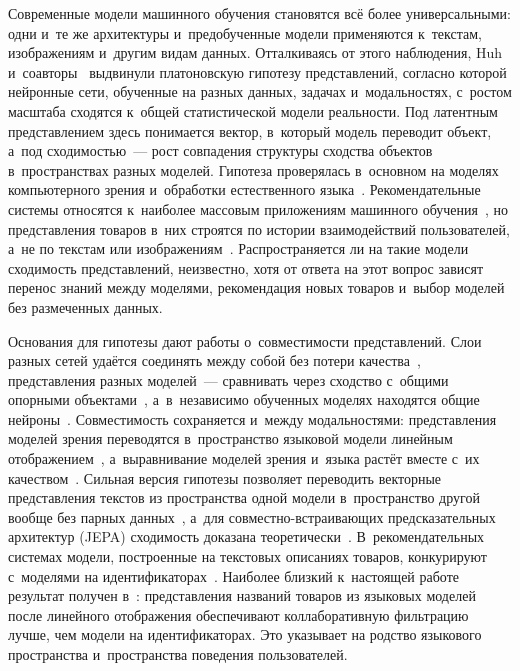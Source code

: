 \documentclass[a4paper,12pt]{article}
\begin{document}
Современные модели машинного обучения становятся всё более универсальными:
одни и~те же архитектуры и~предобученные модели применяются к~текстам, изображениям
и~другим видам данных. Отталкиваясь от этого наблюдения, Huh и~соавторы~\cite{huh2024platonic}
выдвинули платоновскую гипотезу представлений, согласно которой нейронные сети,
обученные на разных данных, задачах и~модальностях, с~ростом масштаба сходятся
к~общей статистической модели реальности. Под латентным представлением здесь
понимается вектор, в~который модель переводит объект, а~под сходимостью~--- рост
совпадения структуры сходства объектов в~пространствах разных моделей. Гипотеза
проверялась в~основном на моделях компьютерного зрения и~обработки естественного
языка~\cite{huh2024platonic,maniparambil2024,sharma2024checkup}. Рекомендательные
системы относятся к~наиболее массовым приложениям машинного обучения~\cite{zhai2024hstu},
но представления товаров в~них строятся по истории взаимодействий пользователей,
а~не по текстам или изображениям~\cite{kang2018sasrec,sun2019bert4rec}.
Распространяется ли на такие модели сходимость представлений, неизвестно, хотя
от ответа на этот вопрос зависят перенос знаний между моделями, рекомендация новых
товаров и~выбор моделей без размеченных данных.

Основания для гипотезы дают работы о~совместимости представлений. Слои разных сетей
удаётся соединять между собой без потери качества~\cite{lenc2015equivariance,bansal2021stitching},
представления разных моделей~--- сравнивать через сходство с~общими опорными
объектами~\cite{moschella2023relative}, а~в~независимо обученных моделях находятся
общие нейроны~\cite{dravid2023rosetta}. Совместимость сохраняется и~между модальностями:
представления моделей зрения переводятся в~пространство языковой модели линейным
отображением~\cite{merullo2023linearly}, а~выравнивание моделей зрения и~языка растёт
вместе с~их качеством~\cite{huh2024platonic,maniparambil2024}. Сильная версия гипотезы
позволяет переводить векторные представления текстов из пространства одной модели
в~пространство другой вообще без парных данных~\cite{jha2025vec2vec}, а~для
совместно-встраивающих предсказательных архитектур (JEPA) сходимость доказана
теоретически~\cite{balestriero2026jepa}. В~рекомендательных системах модели,
построенные на текстовых описаниях товаров, конкурируют с~моделями
на идентификаторах~\cite{hou2022unisrec,li2023recformer,yuan2023idvsmodality}.
Наиболее близкий к~настоящей работе результат получен в~\cite{sheng2025alpharec}:
представления названий товаров из языковых моделей после линейного отображения
обеспечивают коллаборативную фильтрацию лучше, чем модели на идентификаторах.
Это указывает на родство языкового пространства и~пространства поведения
пользователей.
\end{document}
